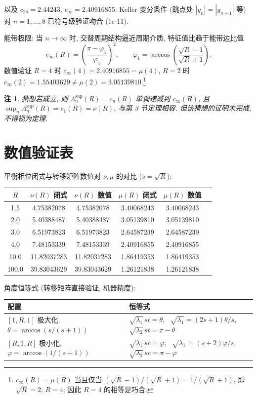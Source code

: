 \documentclass[UTF8]{ctexart}
\newtheorem{remark}[theorem]{注}
\begin{document}
以及 $c_{24} = 2.44243$, $c_{\infty} = 2.40916855$. Keller 变分条件 (跳点处 $|y_n| = |y_{n+1}|$ 等)
对 $n = 1, \dots, 8$ 已符号级验证吻合 (1e-11).

能带极限: 当 $n \to \infty$ 时, 交替周期结构逼近周期介质, 特征值比趋于能带边比值
\begin{equation}
	c_{\infty}(R) = \left( \frac{\pi - \varphi_1}{\varphi_1} \right)^2,
	\qquad \varphi_1 = \arccos\left( \frac{\sqrt{R}-1}{\sqrt{R}+1} \right).
\end{equation}
数值验证 $R = 4$ 时 $c_{\infty}(4) = 2.40916855 = \mu(4)$, $R = 2$ 时
$c_{\infty}(2) = 1.55403629 \neq \mu(2) = 3.05139810$.\footnote{$c_{\infty}(R) = \mu(R)$ 当且仅当 $(\sqrt{R}-1)/(\sqrt{R}+1) = 1/(\sqrt{R}+1)$, 即 $\sqrt{R} = 2$, $R = 4$; 因此 $R=4$ 的相等是巧合.}

\begin{remark}
猜想若成立, 则 $\Lambda_n^{\sup}(R) = c_n(R)$ 单调递减到 $c_{\infty}(R)$,
且 $\sup_n \Lambda_n^{\sup}(R) = c_1(R) = \nu(R)$, 与第 3 节定理相容.
但该猜想的证明未完成, 不得视为定理.
\end{remark}

\section{数值验证表}

平衡相位闭式与转移矩阵数值对 $\nu, \mu$ 的对比 ($s = \sqrt{R}$):

\begin{center}
\begin{tabular}{cccccc}
	\toprule
	$R$ & $\nu(R)$ 闭式 & $\nu(R)$ 数值 & $\mu(R)$ 闭式 & $\mu(R)$ 数值 \\
	\midrule
	1.5 & 4.75382078 & 4.75382078 & 3.40068243 & 3.40068243 \\
	2.0 & 5.40388487 & 5.40388487 & 3.05139810 & 3.05139810 \\
	3.0 & 6.51973823 & 6.51973823 & 2.64587239 & 2.64587239 \\
	4.0 & 7.48153339 & 7.48153339 & 2.40916855 & 2.40916855 \\
	10.0 & 11.82037283 & 11.82037283 & 1.86419353 & 1.86419353 \\
	100.0 & 39.83043629 & 39.83043629 & 1.26121838 & 1.26121838 \\
	\bottomrule
\end{tabular}
\end{center}

角度恒等式 (转移矩阵直接验证, 机器精度):

\begin{center}
\begin{tabular}{ll}
	\toprule
	配置 & 恒等式 \\
	\midrule
	$[1,R,1]$ 极大化, $\theta = \arccos(s/(s+1))$ & $\sqrt{\lambda_1}\,s t = \theta$, \ $\sqrt{\lambda_1} = (2s+1)\theta/s$, \ $\sqrt{\lambda_2}\,s t = \pi-\theta$ \\
	$[R,1,R]$ 极小化, $\varphi = \arccos(1/(s+1))$ & $\sqrt{\lambda_1}\,s c = \varphi$, \ $\sqrt{\lambda_1} = (s+2)\varphi/s$, \ $\sqrt{\lambda_2}\,s c = \pi-\varphi$ \\
	\bottomrule
\end{tabular}
\end{center}
\end{document}
